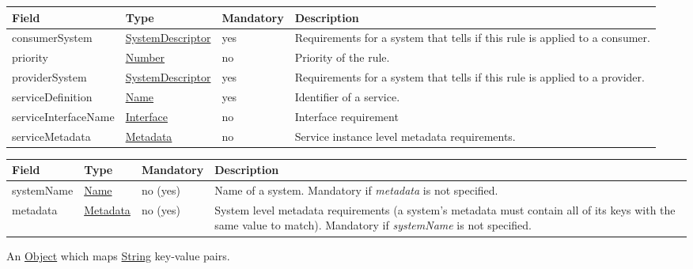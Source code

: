 \documentclass[a4paper]{arrowhead}
\newcommand{\pref}[1]{{\textcolor{ArrowheadGrey}{\hyperref[sec:model:primitives:#1]{#1}}}}
\begin{document}
\label{sec:model:FlexibleRule}
 
\begin{table}[ht!]
\begin{tabularx}{\textwidth}{| p{3.5cm} | p{3cm} | p{2cm} | X |} \hline
\rowcolor{gray!33} Field & Type & Mandatory & Description \\ \hline
consumerSystem & \hyperref[sec:model:SystemDescriptor]{SystemDescriptor} & yes & Requirements for a system that tells if this rule is applied to a consumer. \\ \hline
priority & \pref{Number} & no & Priority of the rule. \\ \hline
providerSystem & \hyperref[sec:model:SystemDescriptor]{SystemDescriptor} & yes & Requirements for a system that tells if this rule is applied to a provider. \\ \hline
serviceDefinition & \pref{Name} & yes & Identifier of a service. \\ \hline
serviceInterfaceName & \pref{Interface} & no & Interface requirement \\ \hline
serviceMetadata & \hyperref[sec:model:Metadata]{Metadata} & no & Service instance level metadata requirements. \\ \hline

\end{tabularx}
\end{table}

\label{sec:model:SystemDescriptor}

\begin{table}[ht!]
\begin{tabularx}{\textwidth}{| p{3cm} | p{3cm} | p{2cm} | X |} \hline
\rowcolor{gray!33} Field & Type & Mandatory & Description \\ \hline
systemName & \pref{Name} & no (yes) & Name of a system. Mandatory if \textit{metadata} is not specified. \\ \hline
metadata & \hyperref[sec:model:Metadata]{Metadata} & no (yes) & System level metadata requirements (a system's metadata must contain all of its keys with the same value to match). Mandatory if \textit{systemName} is not specified. \\ \hline
\end{tabularx}
\end{table}


\label{sec:model:Metadata}

An \pref{Object} which maps \pref{String} key-value pairs.
\end{document}
